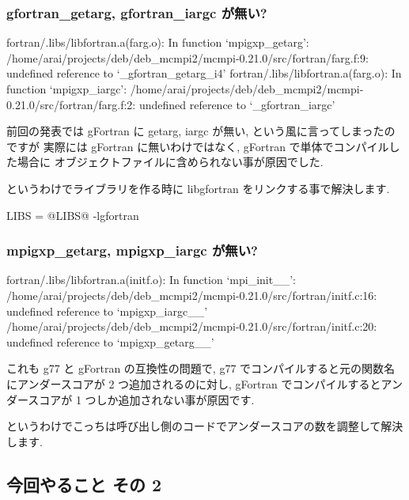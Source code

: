 \documentclass[mingoth,a4paper]{jsarticle}
\begin{document}
\begin{commandline}
\subsubsection{gfortran\_getarg, gfortran\_iargc が無い?}

\begin{commandline}
fortran/.libs/libfortran.a(farg.o): In function `mpigxp_getarg':
/home/arai/projects/deb/deb_mcmpi2/mcmpi-0.21.0/src/fortran/farg.f:9: 
 undefined reference to `_gfortran_getarg_i4'
fortran/.libs/libfortran.a(farg.o): In function `mpigxp_iargc':
/home/arai/projects/deb/deb_mcmpi2/mcmpi-0.21.0/src/fortran/farg.f:2: 
 undefined reference to `_gfortran_iargc'
\end{commandline}

前回の発表では gFortran に getarg, iargc が無い,
という風に言ってしまったのですが
実際には gFortran に無いわけではなく, gFortran で単体でコンパイルした場合に
オブジェクトファイルに含められない事が原因でした.

というわけでライブラリを作る時に libgfortran をリンクする事で解決します.

\begin{commandline}
LIBS = @LIBS@ -lgfortran
\end{commandline}

\subsubsection{mpigxp\_getarg, mpigxp\_iargc が無い?}

\begin{commandline}
fortran/.libs/libfortran.a(initf.o): In function `mpi_init__':
/home/arai/projects/deb/deb_mcmpi2/mcmpi-0.21.0/src/fortran/initf.c:16: 
 undefined reference to `mpigxp_iargc__'
/home/arai/projects/deb/deb_mcmpi2/mcmpi-0.21.0/src/fortran/initf.c:20: 
 undefined reference to `mpigxp_getarg__'
\end{commandline}

これも g77 と gFortran の互換性の問題で,
g77 でコンパイルすると元の関数名にアンダースコアが 2 つ追加されるのに対し,
gFortran でコンパイルするとアンダースコアが 1 つしか追加されない事が原因です.

というわけでこっちは呼び出し側のコードでアンダースコアの数を調整して解決します.

\subsection{今回やること その 2}


\end{commandline}
\end{document}
